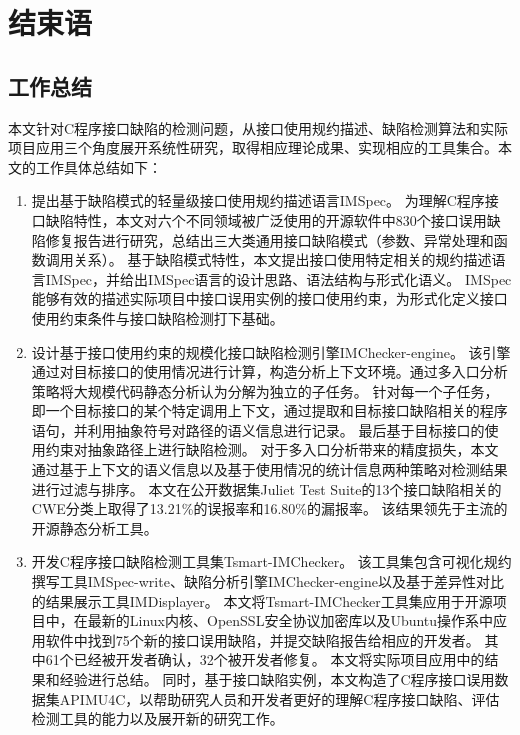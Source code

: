 \chapter{结束语}
\label{cha:con}

\section{工作总结}
本文针对C程序接口缺陷的检测问题，从接口使用规约描述、缺陷检测算法和实际项目应用三个角度展开系统性研究，取得相应理论成果、实现相应的工具集合。本文的工作具体总结如下：
\begin{enumerate}
	\item 提出基于缺陷模式的轻量级接口使用规约描述语言IMSpec。
	为理解C程序接口缺陷特性，本文对六个不同领域被广泛使用的开源软件中830个接口误用缺陷修复报告进行研究，总结出三大类通用接口缺陷模式（参数、异常处理和函数调用关系）。
	基于缺陷模式特性，本文提出接口使用特定相关的规约描述语言IMSpec，并给出IMSpec语言的设计思路、语法结构与形式化语义。
	IMSpec能够有效的描述实际项目中接口误用实例的接口使用约束，为形式化定义接口使用约束条件与接口缺陷检测打下基础。
	
	\item 设计基于接口使用约束的规模化接口缺陷检测引擎IMChecker-engine。
	该引擎通过对目标接口的使用情况进行计算，构造分析上下文环境。通过多入口分析策略将大规模代码静态分析认为分解为独立的子任务。
	针对每一个子任务，即一个目标接口的某个特定调用上下文，通过提取和目标接口缺陷相关的程序语句，并利用抽象符号对路径的语义信息进行记录。
	最后基于目标接口的使用约束对抽象路径上进行缺陷检测。
	对于多入口分析带来的精度损失，本文通过基于上下文的语义信息以及基于使用情况的统计信息两种策略对检测结果进行过滤与排序。
	本文在公开数据集Juliet Test Suite的13个接口缺陷相关的CWE分类上取得了13.21\%的误报率和16.80\%的漏报率。
	该结果领先于主流的开源静态分析工具。
	
	\item 开发C程序接口缺陷检测工具集Tsmart-IMChecker。
	该工具集包含可视化规约撰写工具IMSpec-write、缺陷分析引擎IMChecker-engine以及基于差异性对比的结果展示工具IMDisplayer。
	本文将Tsmart-IMChecker工具集应用于开源项目中，在最新的Linux内核、OpenSSL安全协议加密库以及Ubuntu操作系中应用软件中找到75个新的接口误用缺陷，并提交缺陷报告给相应的开发者。
	其中61个已经被开发者确认，32个被开发者修复。
	本文将实际项目应用中的结果和经验进行总结。
	同时，基于接口缺陷实例，本文构造了C程序接口误用数据集APIMU4C，以帮助研究人员和开发者更好的理解C程序接口缺陷、评估检测工具的能力以及展开新的研究工作。
	
\end{enumerate}


